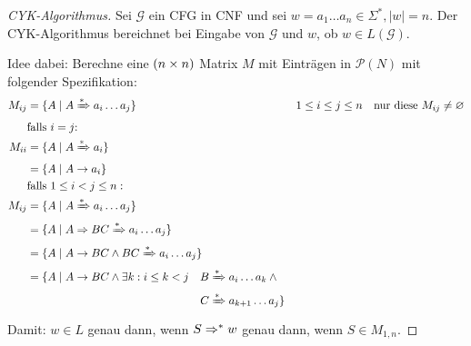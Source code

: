 \begin{proof}[CYK-Algorithmus] Sei $\mathcal{G}$ ein CFG in CNF und sei $w = a_1\dots a_n\in\Sigma^*, |w|=n$. Der CYK-Algorithmus bereichnet bei Eingabe von $\mathcal{G}$ und $w$, ob $w\in L(\mathcal{G})$.
		
		Idee dabei: Berechne eine $(n\times n)$ Matrix $M$ mit Einträgen in $\mathcal{P}(N)$ mit folgender Spezifikation:
	\begin{align*}
		M_{ij} &= \{ A \mid A\xRightarrow{*} a_i\dots a_j \} && 1\leq i\leq j\leq n \quad\text{nur diese }M_{ij}\neq \varnothing\\
		& \text{falls $i=j$:}\\
		M_{ii} &= \{ A \mid A\xRightarrow{*} a_i\}\\
		&= \{A \mid A\-> a_i \} \\
		&\text{falls }1\leq i<j\leq n:\\
		M_{ij} &= \{ A \mid A\xRightarrow{*} a_i\dots a_j \}\\
		&= \{ A \mid A\=> BC \xRightarrow{*} a_i\dots a_j \}\\
		&= \{ A \mid A\-> BC \land BC \xRightarrow{*} a_i\dots a_j \}\\
		&= \{ A \mid A\-> BC \land \exists k: i\leq k<j\quad 
			\begin{aligned}[t]
				B &\xRightarrow{*} a_i\dots a_k \land{}\\
				C &\xRightarrow{*} a_{k+1}\dots a_j \}
			\end{aligned}\\
	\end{align*}
	Damit: $w\in L$ genau dann, wenn $S \=>^* w$ genau dann, wenn $S \in M_{1,n}$.
	

\end{proof}
